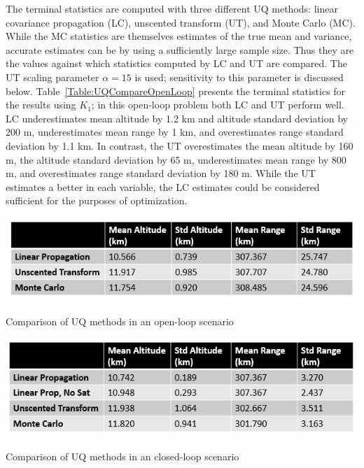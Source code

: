 The terminal statistics are computed with three different UQ methods: linear covariance propagation (LC), unscented transform (UT), and Monte Carlo (MC). While the MC statistics are themselves estimates of the true mean and variance, accurate estimates can be by using a sufficiently large sample size. Thus they are the values against which statistics computed by LC and UT are compared. The UT scaling parameter $\alpha=15$ is used; sensitivity to this parameter is discussed below. Table~\ref{Table:UQCompareOpenLoop} presents the terminal statistics for the results using $K_1$; in this open-loop problem both LC and UT perform well. LC underestimates mean altitude by 1.2 km and altitude standard deviation by 200 m, underestimates mean range by 1 km, and overestimates range standard deviation by 1.1 km. In contrast, the UT overestimates the mean altitude by 160 m, the altitude standard deviation by 65 m, underestimates mean range by 800 m, and overestimates range standard deviation by 180 m. While the UT estimates a better in each variable, the LC estimates could be considered sufficient for the purposes of optimization. 

\begin{table}[h!]
	\centering
	\includegraphics[width=1\textwidth]{Images/UQExample_Open}
	\caption{Comparison of UQ methods in an open-loop scenario}
	\label{Table:UQCompareOpenLoop}
\end{table}
\begin{table}[h!]
	\centering
	\includegraphics[width=1\textwidth]{Images/UQExample_Closed}
	\caption{Comparison of UQ methods in an closed-loop scenario}
	\label{Table:UQCompareClosedLoop}
\end{table}

